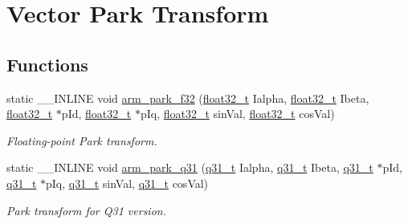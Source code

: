 \hypertarget{group__park}{}\section{Vector Park Transform}
\label{group__park}
\subsection*{Functions}
\begin{DoxyCompactItemize}
\item 
static \+\_\+\+\_\+\+I\+N\+L\+I\+NE void \hyperlink{group__park_ga08b3a683197de7e143fb00497787683c}{arm\+\_\+park\+\_\+f32} (\hyperlink{arm__math_8h_a4611b605e45ab401f02cab15c5e38715}{float32\+\_\+t} Ialpha, \hyperlink{arm__math_8h_a4611b605e45ab401f02cab15c5e38715}{float32\+\_\+t} Ibeta, \hyperlink{arm__math_8h_a4611b605e45ab401f02cab15c5e38715}{float32\+\_\+t} $\ast$p\+Id, \hyperlink{arm__math_8h_a4611b605e45ab401f02cab15c5e38715}{float32\+\_\+t} $\ast$p\+Iq, \hyperlink{arm__math_8h_a4611b605e45ab401f02cab15c5e38715}{float32\+\_\+t} sin\+Val, \hyperlink{arm__math_8h_a4611b605e45ab401f02cab15c5e38715}{float32\+\_\+t} cos\+Val)
\begin{DoxyCompactList}\small\item\em Floating-\/point Park transform. \end{DoxyCompactList}\item 
static \+\_\+\+\_\+\+I\+N\+L\+I\+NE void \hyperlink{group__park_gaf4cc6370c0cfc14ea66774ed3c5bb10f}{arm\+\_\+park\+\_\+q31} (\hyperlink{arm__math_8h_adc89a3547f5324b7b3b95adec3806bc0}{q31\+\_\+t} Ialpha, \hyperlink{arm__math_8h_adc89a3547f5324b7b3b95adec3806bc0}{q31\+\_\+t} Ibeta, \hyperlink{arm__math_8h_adc89a3547f5324b7b3b95adec3806bc0}{q31\+\_\+t} $\ast$p\+Id, \hyperlink{arm__math_8h_adc89a3547f5324b7b3b95adec3806bc0}{q31\+\_\+t} $\ast$p\+Iq, \hyperlink{arm__math_8h_adc89a3547f5324b7b3b95adec3806bc0}{q31\+\_\+t} sin\+Val, \hyperlink{arm__math_8h_adc89a3547f5324b7b3b95adec3806bc0}{q31\+\_\+t} cos\+Val)
\begin{DoxyCompactList}\small\item\em Park transform for Q31 version. \end{DoxyCompactList}\end{DoxyCompactItemize}


